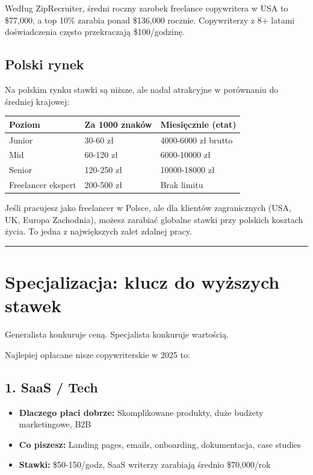 \documentclass[
  12pt,
  a4paper,
  twoside,
  openright,
  12pt,
  DIV=12,
  BCOR=12mm]{scrbook}
\providecommand{\tightlist}{%
  \setlength{\itemsep}{0pt}\setlength{\parskip}{0pt}}\usepackage{longtable,booktabs,array}
\newcommand{\decoline}{%
  \begin{center}
    \textcolor{bordergray}{\rule{0.3\textwidth}{0.5pt}}
  \end{center}
}
\begin{document}
\begin{wazne}
Według ZipRecruiter, średni roczny zarobek freelance copywritera w USA to \$77,000, a top 10\% zarabia ponad \$136,000 rocznie. Copywriterzy z 8+ latami doświadczenia często przekraczają \$100/godzinę.
\end{wazne}

\subsection{Polski rynek}\label{polski-rynek}

Na polskim rynku stawki są niższe, ale nadal atrakcyjne w porównaniu do
średniej krajowej:

\begin{longtable}[]{@{}lll@{}}
\toprule\noalign{}
Poziom & Za 1000 znaków & Miesięcznie (etat) \\
\midrule\noalign{}
\endhead
\bottomrule\noalign{}
\endlastfoot
Junior & 30-60 zł & 4000-6000 zł brutto \\
Mid & 60-120 zł & 6000-10000 zł \\
Senior & 120-250 zł & 10000-18000 zł \\
Freelancer ekspert & 200-500 zł & Brak limitu \\
\end{longtable}

\begin{wskazowka}
Jeśli pracujesz jako freelancer w Polsce, ale dla klientów zagranicznych (USA, UK, Europa Zachodnia), możesz zarabiać globalne stawki przy polskich kosztach życia. To jedna z największych zalet zdalnej pracy.
\end{wskazowka}

\decoline

\section{Specjalizacja: klucz do wyższych
stawek}\label{specjalizacja-klucz-do-wyux17cszych-stawek}

Generalista konkuruje ceną. Specjalista konkuruje wartością.

Najlepiej opłacane nisze copywriterskie w 2025 to:

\subsection{1. SaaS / Tech}\label{saas-tech}

\begin{itemize}
\tightlist
\item
  \textbf{Dlaczego płaci dobrze:} Skomplikowane produkty, duże budżety
  marketingowe, B2B
\item
  \textbf{Co piszesz:} Landing pages, emails, onboarding, dokumentacja,
  case studies
\item
  \textbf{Stawki:} \$50-150/godz, SaaS writerzy zarabiają średnio
  \$70,000/rok
\end{itemize}
\end{document}
